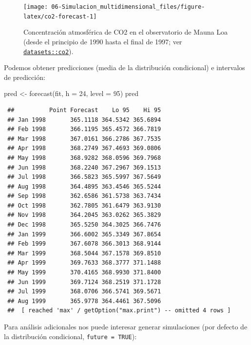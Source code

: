 \documentclass[
]{book}
\newenvironment{Shaded}{\begin{snugshade}}{\end{snugshade}}
\newcommand{\AttributeTok}[1]{\textcolor[rgb]{0.77,0.63,0.00}{#1}}
\newcommand{\DecValTok}[1]{\textcolor[rgb]{0.00,0.00,0.81}{#1}}
\newcommand{\FunctionTok}[1]{\textcolor[rgb]{0.00,0.00,0.00}{#1}}
\newcommand{\NormalTok}[1]{#1}
\newcommand{\OtherTok}[1]{\textcolor[rgb]{0.56,0.35,0.01}{#1}}
\theoremstyle{break}
\theoremstyle{nonumberplain}
\begin{document}
\begin{figure}[!htb]

{\centering \texttt{[image: 06-Simulacion\_multidimensional\_files/figure-latex/co2-forecast-1]} 

}

\caption{Concentración atmosférica de CO2 en el observatorio de Mauna Loa (desde el principio de 1990 hasta el final de 1997; ver \href{https://rdrr.io/r/datasets/co2.html}{\texttt{datasets::co2}}).}\label{fig:co2-forecast}
\end{figure}

Podemos obtener predicciones (media de la distribución condicional) e intervalos de predicción:

\begin{Shaded}
\begin{Highlighting}[]
\NormalTok{pred }\OtherTok{\textless{}{-}} \FunctionTok{forecast}\NormalTok{(fit, }\AttributeTok{h =} \DecValTok{24}\NormalTok{, }\AttributeTok{level =} \DecValTok{95}\NormalTok{)}
\NormalTok{pred}
\end{Highlighting}
\end{Shaded}

\begin{verbatim}
 ##          Point Forecast    Lo 95    Hi 95
 ## Jan 1998       365.1118 364.5342 365.6894
 ## Feb 1998       366.1195 365.4572 366.7819
 ## Mar 1998       367.0161 366.2786 367.7535
 ## Apr 1998       368.2749 367.4693 369.0806
 ## May 1998       368.9282 368.0596 369.7968
 ## Jun 1998       368.2240 367.2967 369.1513
 ## Jul 1998       366.5823 365.5997 367.5649
 ## Aug 1998       364.4895 363.4546 365.5244
 ## Sep 1998       362.6586 361.5738 363.7434
 ## Oct 1998       362.7805 361.6479 363.9130
 ## Nov 1998       364.2045 363.0262 365.3829
 ## Dec 1998       365.5250 364.3025 366.7476
 ## Jan 1999       366.6002 365.3349 367.8654
 ## Feb 1999       367.6078 366.3013 368.9144
 ## Mar 1999       368.5044 367.1578 369.8510
 ## Apr 1999       369.7633 368.3777 371.1488
 ## May 1999       370.4165 368.9930 371.8400
 ## Jun 1999       369.7124 368.2519 371.1728
 ## Jul 1999       368.0706 366.5741 369.5671
 ## Aug 1999       365.9778 364.4461 367.5096
 ##  [ reached 'max' / getOption("max.print") -- omitted 4 rows ]
\end{verbatim}

Para análisis adicionales nos puede interesar generar simulaciones (por defecto de la distribución condicional, \texttt{future\ =\ TRUE}):
\end{document}
